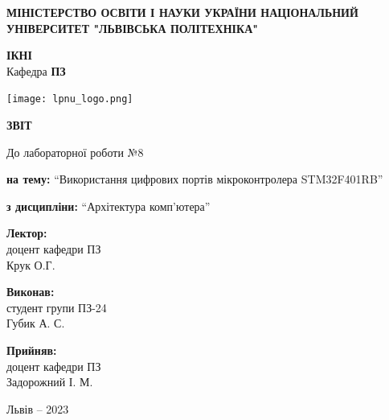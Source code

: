 \documentclass[12pt]{extarticle}
\begin{document}
\begin{titlepage}
    \begin{center}
        \textbf{\normalsize{\MakeUppercase{
            Міністерство Освіти і науки України
            Національний університет "Львівська політехніка"
        }}}

        \begin{flushright}
        \textbf{ІКНІ}\\
        Кафедра \textbf{ПЗ}
        \end{flushright}
        \vspace{15mm}

        \texttt{[image: lpnu\_logo.png]}

        \vspace*{\fill}

        \textbf{\normalsize{\MakeUppercase{Звіт}}}
            
        До лабораторної роботи №8

        \textbf{на тему:} “Використання цифрових портів мікроконтролера STM32F401RB”

        \textbf{з дисципліни:} “Архітектура комп’ютера”
            
        \vspace*{\fill}

        \begin{flushright}

            \textbf{Лектор:}\\
            доцент кафедри ПЗ\\
            Крук О.Г.\\
            \vspace{12pt}

            \textbf{Виконав:}\\
            студент групи ПЗ-24\\
            Губик А. С.\\
            \vspace{12pt}

            \textbf{Прийняв:}\\
            доцент кафедри ПЗ\\
            Задорожний І. М.\\
        \vspace{12pt}
        \end{flushright}

        Львів -- 2023
            
            
    \end{center}
\end{titlepage}
\end{document}
